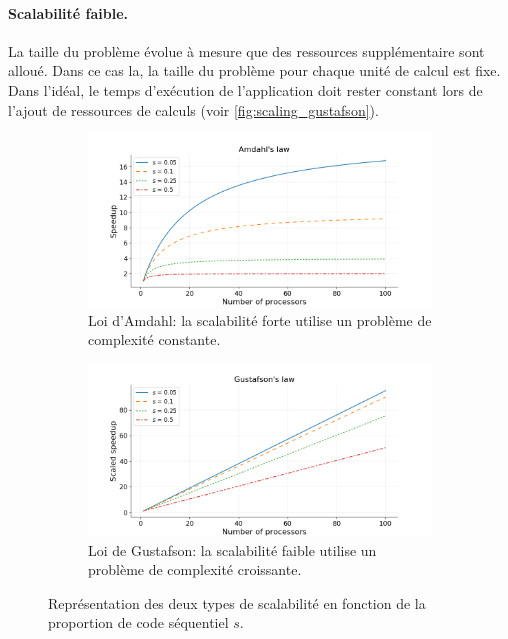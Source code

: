     \paragraph{Scalabilité faible.} La taille du problème évolue à mesure que des ressources supplémentaire sont alloué. Dans ce cas la, la taille du problème pour chaque unité de calcul est fixe. Dans l'idéal, le temps d'exécution de l'application doit rester constant lors de l'ajout de ressources de calculs (voir \autoref{fig:scaling_gustafson}). 
        
        \begin{figure}[t!]
            \centering
            \begin{subfigure}[t]{0.48\textwidth}
                \centering
                \includegraphics[width=1.05\linewidth]{images/scaling_amdahl.png}
                \caption{\label{fig:scaling_amdahl}Loi d'Amdahl: la scalabilité forte utilise un problème de complexité constante.}
            \end{subfigure}\hfill
        \begin{subfigure}[t]{0.48\textwidth}
                \centering
                \includegraphics[width=1.05\linewidth]{images/scaling_gustafson.png}
                \caption{\label{fig:scaling_gustafson}Loi de Gustafson: la scalabilité faible utilise un problème de complexité croissante.}
            \end{subfigure}
            \caption{\label{fig:scaling}Représentation des deux types de scalabilité en fonction de la proportion de code séquentiel $s$\protect\footnotemark.}
        \end{figure}
            

